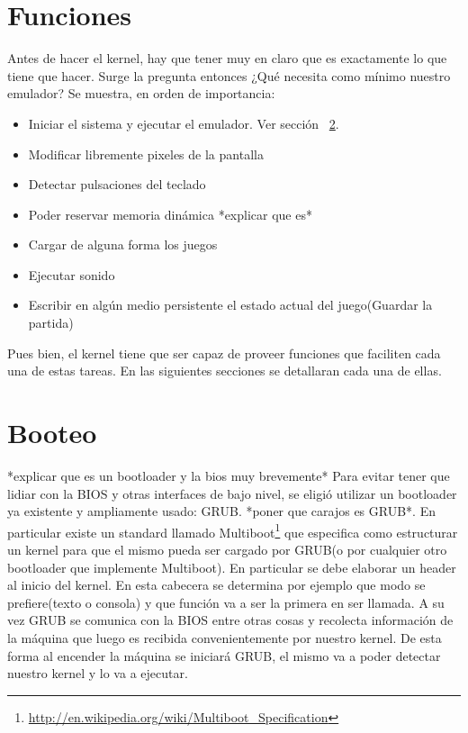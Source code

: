 \section{Funciones}
Antes de hacer el kernel, hay que tener muy en claro que es exactamente lo que tiene que hacer. Surge la pregunta entonces ¿Qué necesita como mínimo nuestro emulador? Se muestra, en orden de importancia:
\begin{itemize}
\item Iniciar el sistema y ejecutar el emulador. Ver sección ~\ref{sec:booteo}.
\item Modificar libremente pixeles de la pantalla
\item Detectar pulsaciones del teclado
\item Poder reservar memoria dinámica *explicar que es*
\item Cargar de alguna forma los juegos
\item Ejecutar sonido
\item Escribir en algún medio persistente el estado actual del juego(Guardar la partida)
\end{itemize}
Pues bien, el kernel tiene que ser capaz de proveer funciones que faciliten cada una de estas tareas. En las siguientes secciones se detallaran cada una de ellas.

\section{Booteo}\label{sec:booteo}
*explicar que es un bootloader y la bios muy brevemente*
Para evitar tener que lidiar con la BIOS y otras interfaces de bajo nivel, se eligió utilizar un bootloader ya existente y ampliamente usado: GRUB. *poner que carajos es GRUB*. En particular existe un standard llamado Multiboot\footnote{\url{http://en.wikipedia.org/wiki/Multiboot_Specification}} que especifica como estructurar un kernel para que el mismo pueda ser cargado por GRUB(o por cualquier otro bootloader que implemente Multiboot). En particular se debe elaborar un header al inicio del kernel. En esta cabecera se determina por ejemplo que modo se prefiere(texto o consola) y que función va a ser la primera en ser llamada. A su vez GRUB se comunica con la BIOS entre otras cosas y recolecta información de la máquina que luego es recibida convenientemente por nuestro kernel. De esta forma al encender la máquina se iniciará GRUB, el mismo va a poder detectar nuestro kernel y lo va a ejecutar.

